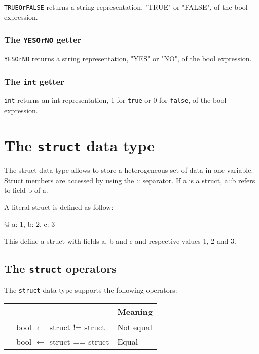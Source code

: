 \documentclass[10pt,openright,twosides]{report}
\newcommand{\gtltype}[1]{{\small\ttfamily #1}}
\newcommand{\var}[1]{{\small\ttfamily #1}}
\newcommand{\icst}[1]{{\footnotesize\ttfamily\colorbox{light-blue}{#1}}}
\newcommand{\scst}[1]{{\footnotesize\ttfamily\colorbox{light-blue}{"#1"}}}
\newcommand{\gtlinline}[1]{\colorbox{light-blue}{\lstinline[language=gtl]{#1}}}
\begin{document}
\gtlinline{TRUEOrFALSE} returns a string representation, \scst{TRUE} or \scst{FALSE}, of the bool expression.

\subsubsection{The \texttt{YESOrNO} getter}
\label{sec:YESOrNOGetter}

\gtlinline{YESOrNO} returns a string representation, \scst{YES} or \scst{NO}, of the bool expression.

\subsubsection{The \texttt{int} getter}

\gtlinline{int} returns an int representation, \icst{1} for \gtlinline{true} or \icst{0} for \gtlinline{false}, of the bool expression.


\section{The \texttt{struct} data type}

The \gtltype{struct} data type allows to store a heterogeneous set of data in one variable. Struct members are accessed by using the \var{::} separator. If \var{a} is a \gtltype{struct}, \var{a::b} refers to field \var{b} of \var{a}.

A literal struct is defined as follow:

\begin{gtl}
@{ a: 1, b: 2, c: 3 }
\end{gtl}

This define a struct with fields a, b and c and respective values 1, 2 and 3.

\subsection{The \texttt{struct} operators}

The \lstinline{struct} data type supports the following operators:

\begin{longtable}{>{\ttfamily}l|>{\ttfamily}l|p{2.43in}}
{\bf Operator}&{\bf Expression type}&{\bf Meaning}\\
\hline\endhead
 {!=}&
  {bool $\leftarrow$ struct != struct}&
  {Not equal}\\
 {==}&
  {bool $\leftarrow$ struct == struct}&
  {Equal}\\
\end{longtable}
\end{document}
